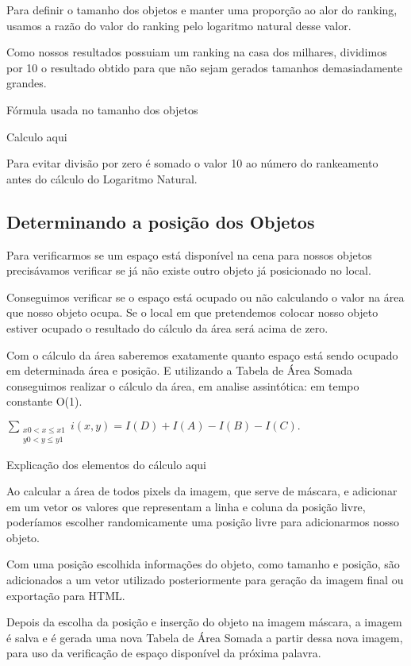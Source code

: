 \documentclass[12pt]{article}
\begin{document}
Para definir o tamanho dos objetos e manter uma proporção ao alor do ranking, usamos a razão do valor do ranking pelo logaritmo natural desse valor.

Como nossos resultados possuiam um ranking na casa dos milhares, dividimos por 10 o resultado obtido para que não sejam gerados tamanhos demasiadamente grandes. 

{Fórmula usada no tamanho dos objetos}


{Calculo aqui}

Para evitar divisão por zero é somado o valor 10 ao número do rankeamento antes do cálculo do Logaritmo Natural.


\subsection{Determinando a posição dos Objetos}

Para verificarmos se um espaço está disponível na cena para nossos objetos precisávamos verificar se já não existe outro objeto já posicionado no local. 

Conseguimos verificar se o espaço está ocupado ou não calculando o valor na área que nosso objeto ocupa. Se o local em que pretendemos colocar nosso objeto estiver ocupado o resultado do cálculo da área será acima de zero.

Com o cálculo da área saberemos exatamente quanto espaço está sendo ocupado em determinada área e posição. E utilizando a Tabela de Área Somada conseguimos realizar o cálculo da área, em analise assintótica: em tempo constante O(1).

$\sum_{\begin{smallmatrix} x0 < x \le x1 \\ y0 < y \le y1 \end{smallmatrix}} i(x,y) = I(D) + I(A) - I(B) - I(C).$

{Explicação dos elementos do cálculo aqui} 

Ao calcular a área de todos pixels da imagem, que serve de máscara, e adicionar em um vetor os valores que representam a linha e coluna da posição livre, poderíamos escolher randomicamente uma posição livre para adicionarmos nosso objeto.

Com uma posição escolhida informações do objeto, como tamanho e posição, são adicionados a um vetor utilizado posteriormente para geração da imagem final ou exportação para HTML. 

Depois da escolha da posição e inserção do objeto na imagem máscara, a imagem é salva e é gerada uma nova Tabela de Área Somada a partir dessa nova imagem, para uso da verificação de espaço disponível da próxima palavra. 
\end{document}
